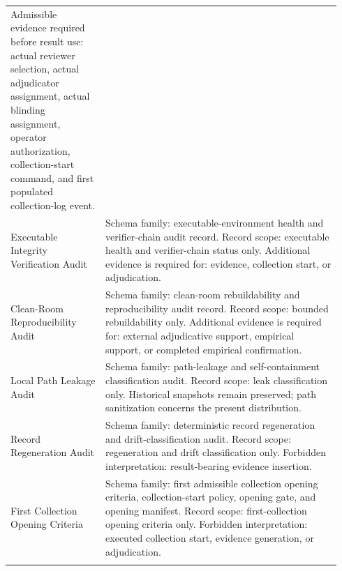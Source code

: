 \documentclass[11pt,a4paper]{article}
\begin{document}
\begin{longtable}{@{}>{\raggedright\arraybackslash}p{0.27\linewidth}p{0.67\linewidth}@{}}
Admissible evidence required before result use: actual reviewer selection,
actual adjudicator assignment, actual blinding assignment, operator
authorization, collection-start command, and first populated collection-log
event. \\ \addlinespace
Executable Integrity Verification Audit & Schema family: executable-environment health and verifier-chain audit record.\newline 
Record scope: executable health and verifier-chain status only.
Additional evidence is required for: evidence, collection start, or adjudication. \\ \addlinespace
Clean-Room Reproducibility Audit & Schema family: clean-room rebuildability and reproducibility audit record.\newline 
Record scope: bounded rebuildability only. Additional evidence is required for:
external adjudicative support, empirical support, or completed empirical confirmation. \\ \addlinespace
Local Path Leakage Audit & Schema family: path-leakage and self-containment classification audit.\newline 
Record scope: leak classification only. Historical snapshots remain preserved; path sanitization concerns the present distribution. \\ \addlinespace
Record Regeneration Audit & Schema family: deterministic record regeneration and drift-classification audit.\newline 
Record scope: regeneration and drift classification only. Forbidden
interpretation: result-bearing evidence insertion. \\ \addlinespace
First Collection Opening Criteria & Schema family: first admissible collection opening criteria,
collection-start policy, opening gate, and opening manifest.\newline 
Record scope: first-collection opening criteria only. Forbidden
interpretation: executed collection start, evidence generation, or adjudication. \\ \addlinespace
\bottomrule\end{longtable}
\endgroup


\end{document}
